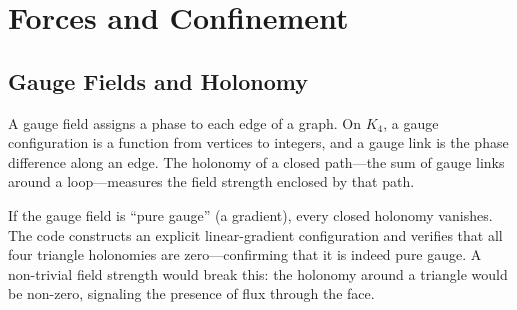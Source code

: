 \documentclass[11pt,a4paper]{book}
\begin{document}
\begin{code}
\>[0][@{}l@{\AgdaIndent{0}}]%
\>[2]\AgdaSymbol{\{}\AgdaSpace{}%
\AgdaSpace{}%
\AgdaSymbol{=}\AgdaSpace{}%
\<%
\\
%
\>[2]\AgdaSymbol{;}\AgdaSpace{}%
%
\>[26]\AgdaSymbol{=}\AgdaSpace{}%
\<%
\\
%
\>[2]\AgdaSymbol{;}\AgdaSpace{}%
%
\>[26]\AgdaSymbol{=}\AgdaSpace{}%
\<%
\\
%
\>[2]\AgdaSymbol{;}\AgdaSpace{}%
%
\>[26]\AgdaSymbol{=}\AgdaSpace{}%
\<%
\\
%
\>[2]\AgdaSymbol{;}\AgdaSpace{}%
%
\>[26]\AgdaSymbol{=}\AgdaSpace{}%
\<%
\\
%
\>[2]\AgdaSymbol{;}\AgdaSpace{}%
%
\>[26]\AgdaSymbol{=}\AgdaSpace{}%
\AgdaSpace{}%
\AgdaSymbol{\}}\<%
\end{code}

\part{Forces and Confinement}
\label{part:forces-confinement}

\chapter{Gauge Fields and Holonomy}
\label{ch:gauge-fields}

A gauge field assigns a phase to each edge of a graph. On $K_4$, a gauge configuration is a function from vertices to integers, and a gauge link is the phase difference along an edge. The holonomy of a closed path---the sum of gauge links around a loop---measures the field strength enclosed by that path.

If the gauge field is ``pure gauge'' (a gradient), every closed holonomy vanishes. The code constructs an explicit linear-gradient configuration and verifies that all four triangle holonomies are zero---confirming that it is indeed pure gauge. A non-trivial field strength would break this: the holonomy around a triangle would be non-zero, signaling the presence of flux through the face.
\end{document}

